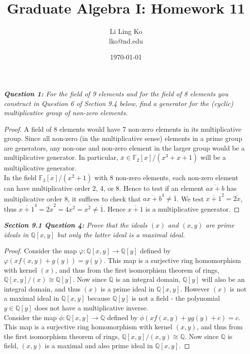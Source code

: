 \documentclass{article}
\begin{document}
\title{Graduate Algebra I: Homework 11}
\author{Li Ling Ko\\ lko@nd.edu}
\date{\today}
\maketitle

\it \textbf{Question 1:} For the field of 9 elements and for the field of 8
  elements you construct in Question 6 of Section 9.4 below, find a
  generator for the (cyclic) multiplicative group of non-zero elements.

  \begin{proof}
    A field of 8 elements would have 7 non-zero elements in its
    multiplicative group. Since all non-zero (in the multiplicative sense)
    elements in a prime group are generators, any non-one and non-zero
    element in the larger group would be a multiplicative generator. In
    particular, $\overline{x}\in\mathbb{F}_2[x]/(x^3+x+1)$ will be a
    multiplicative generator. \\

    In the field $\mathbb{F}_3[x]/(x^2+1)$ with 8 non-zero elements, each
    non-zero element can have multiplicative order 2, 4, or 8. Hence to
    test if an element $\overline{ax+b}$ has multiplicative order 8, it
    suffices to check that $\overline{ax+b}^4\neq\overline{1}$. We test
    $\overline{x+1}^2=\overline{2x}$, thus $\overline{x+1}^4=
    \overline{2x}^2= \overline{4x^2}= \overline{x^2}\neq\overline{1}$.
    Hence $\overline{x+1}$ is a multiplicative generator.
  \end{proof}

\it \textbf{Section 9.1 Question 4:} Prove that the ideals $(x)$ and
  $(x,y)$ are prime ideals in $\mathbb{Q}[x,y]$ but only the latter ideal
  is a maximal ideal.

  \begin{proof}
    Consider the map $\varphi:\mathbb{Q}[x,y]\rightarrow\mathbb{Q}[y]$
    defined by $\varphi(xf(x,y)+g(y))=g(y)$. This map is a surjective ring
    homomorphism with kernel $(x)$, and thus from the first isomorphism
    theorem of rings, $\mathbb{Q}[x,y]/(x)\cong\mathbb{Q}[y]$. Now since
    $\mathbb{Q}$ is an integral domain, $\mathbb{Q}[y]$ will also be an
    integral domain, and thus $(x)$ is a prime ideal in $\mathbb{Q}[x,y]$.
    However $(x)$ is not a maximal ideal in $\mathbb{Q}[x,y]$ because
    $\mathbb{Q}[y]$ is not a field - the polynomial $y\in\mathbb{Q}[y]$
    does not have a multiplicative inverse. \\

    Consider the map $\phi:\mathbb{Q}[x,y]\rightarrow\mathbb{Q}$
    defined by $\phi(xf(x,y)+yg(y)+c)=c$. This map is a surjective ring
    homomorphism with kernel $(x,y)$, and thus from the first isomorphism
    theorem of rings, $\mathbb{Q}[x,y]/(x,y)\cong\mathbb{Q}$. Now since
    $\mathbb{Q}$ is field, $(x,y)$ is a maximal and also prime ideal in
    $\mathbb{Q}[x,y]$.
  \end{proof}
\end{document}
